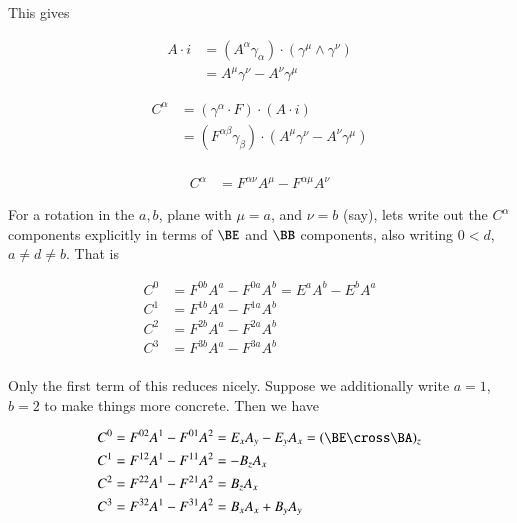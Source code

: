 This gives

\begin{align*}
A \cdot i 
&= (A^\alpha \gamma_\alpha) \cdot (\gamma^{\mu} \wedge \gamma^{\nu}) \\
&= A^\mu \gamma^\nu - A^\nu \gamma^\mu
\end{align*}

\begin{align*}
C^\alpha 
&= (\gamma^\alpha \cdot F) \cdot (A \cdot i) \\
&= ( F^{\alpha\beta} \gamma_\beta ) \cdot ( A^\mu \gamma^\nu - A^\nu \gamma^\mu) \\
\end{align*}

\begin{align}\label{eqn:noetherField:conservedCurrentGeneralIndexes}
C^\alpha 
&= F^{\alpha\nu} A^\mu - F^{\alpha\mu} A^\nu 
\end{align}

For a rotation in the $a,b$, plane with $\mu = a$, and $\nu = b$ (say), lets write out the $C^\alpha$ components explicitly in terms of $\BE$ and $\BB$ components, also
writing $0 < d$, $a \ne d \ne b$.  That is

\begin{align*}
C^0 &= F^{0 b} A^a - F^{0 a} A^b = E^a A^b - E^b A^a \\
C^1 &= F^{1 b} A^a - F^{1 a} A^b \\
C^2 &= F^{2 b} A^a - F^{2 a} A^b \\
C^3 &= F^{3 b} A^a - F^{3 a} A^b \\
\end{align*}

Only the first term of this reduces nicely.  Suppose we additionally write $a = 1$, $b = 2$ to make things more concrete.  Then we have

\begin{align*}
C^0 &= F^{0 2} A^1 - F^{0 1} A^2 = E_x A_y - E_y A_x = (\BE \cross \BA)_z \\
C^1 &= F^{1 2} A^1 - F^{1 1} A^2 = -B_z A_x \\
C^2 &= F^{2 2} A^1 - F^{2 1} A^2 = B_z A_x \\
C^3 &= F^{3 2} A^1 - F^{3 1} A^2 = B_x A_x + B_y A_y \\
\end{align*}

